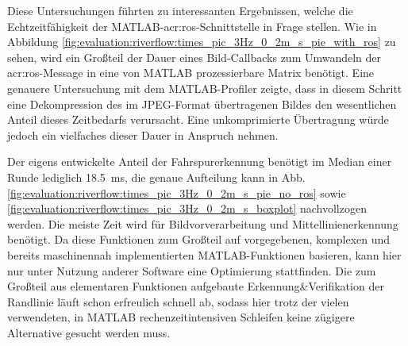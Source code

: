 Diese Untersuchungen führten zu interessanten Ergebnissen, welche die Echtzeitfähigkeit der MATLAB-\gls{acr:ros}-Schnittstelle in Frage stellen. Wie in Abbildung \ref{fig:evaluation:riverflow:times_pic_3Hz_0_2m_s_pie_with_ros} zu sehen, wird ein Großteil der Dauer eines Bild-Callbacks zum Umwandeln der \gls{acr:ros}-Message in eine von MATLAB prozessierbare Matrix benötigt. Eine genauere Untersuchung mit dem MATLAB-Profiler zeigte, dass in diesem Schritt eine Dekompression des im JPEG-Format übertragenen Bildes den wesentlichen Anteil dieses Zeitbedarfs verursacht. Eine unkomprimierte Übertragung würde jedoch ein vielfaches dieser Dauer in Anspruch nehmen.

Der eigens entwickelte Anteil der Fahrspurerkennung benötigt im Median einer Runde lediglich \SI{18,5}{ms}, die genaue Aufteilung kann in Abb. \ref{fig:evaluation:riverflow:times_pic_3Hz_0_2m_s_pie_no_ros} sowie \ref{fig:evaluation:riverflow:times_pic_3Hz_0_2m_s_boxplot} nachvollzogen werden. Die meiste Zeit wird für Bildvorverarbeitung und Mittellinienerkennung benötigt. Da diese Funktionen zum Großteil auf vorgegebenen, komplexen und bereits maschinennah implementierten MATLAB-Funktionen basieren, kann hier nur unter Nutzung anderer Software eine Optimierung stattfinden. Die zum Großteil aus elementaren Funktionen aufgebaute Erkennung\&Verifikation der Randlinie läuft schon erfreulich schnell ab, sodass hier trotz der vielen verwendeten, in MATLAB rechenzeitintensiven Schleifen keine zügigere Alternative gesucht werden muss.

